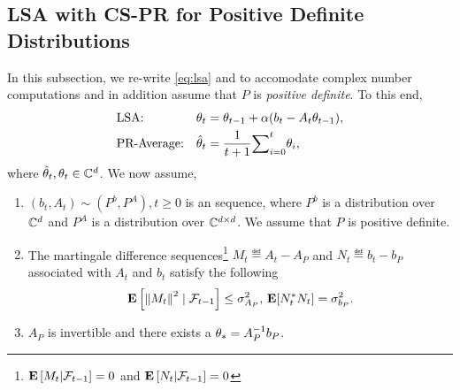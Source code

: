 \subsection{LSA with CS-PR for Positive Definite Distributions}
In this subsection, we re-write \eqref{eq:lsa} and  to accomodate complex number computations and in addition assume that $P$ is \emph{positive definite}. To this end,
\begin{subequations}\label{eq:lsacmplx}
\begin{align}
\label{conststep}&\text{LSA:} &\theta_t&=\theta_{t-1}+\alpha(b_t-A_t\theta_{t-1}),\\
\label{iteravg}&\text{PR-Average:} &\hat{\theta}_t&=\frac{1}{t+1}{\sum}_{i=0}^{t}\theta_i,
\end{align}
\end{subequations}
where $\hat{\theta}_t, \theta_t \in \mathbb{C}^{d}$. We now assume,
\begin{assumption}\label{assmp:lsacmplx}
\begin{enumerate}[leftmargin=*, before = \leavevmode\vspace{-\baselineskip}]
\item \label{dist} $(b_t, A_t)\sim (P^b,P^A), t\geq 0$ is an \iid sequence, where $P^b$ is a distribution over $\mathbb{C}^d$ and $P^A$ is a distribution over $\mathbb{C}^{d \times d}$. We assume that $P$ is positive definite.
\item \label{matvar} The martingale difference sequences\footnote{$\mathbf{E}\left[M_t|\mathcal{F}_{t-1}\right]=0$ and $\mathbf{E}\left[N_t|\mathcal{F}_{t-1}\right]=0$} $M_t\eqdef A_t-A_{P}$ and $N_t\eqdef b_t-b_{P}$ associated with $A_t$ and $b_t$ satisfy the following
\begin{align*}\mathbf{E}\left[ \left\| M_t\right\|^2\mid\mathcal{F}_{t-1}\right]\leq \sigma^2_{A_P}, \, \mathbf{E}[N_t^* N_t]=\sigma^2_{b_P}.\end{align*}
\item $A_P$ is invertible and there exists a $\theta_*=A^{-1}_Pb_P$.
\end{enumerate}
\end{assumption}





